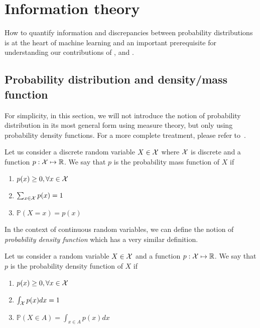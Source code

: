 \section{Information theory}
\label{sec:infoth}
How to quantify information and discrepancies between probability distributions is at the heart of machine learning and an important prerequisite for understanding our contributions of ,  and .

\subsection{Probability distribution and density/mass function}
For simplicity, in this section, we will not introduce the notion of probability distribution in its most general form using measure theory, but only using probability density functions. For a more complete treatment, please refer to~\citet{kolmogorov2018foundations, billingsley2008probability}.

\begin{definition}
Let us consider a discrete random variable $X \in {\mathcal{X}}$ where ${\mathcal{X}}$ is discrete and a function $p: {\mathcal{X}} \mapsto \mathbb{R}$. We say that $p$ is the probability mass function of $X$ if
\begin{enumerate}
    \item $p(x) \ge 0, \forall x \in {\mathcal{X}}$
    \item $\sum_{x \in {\mathcal{X}}} p(x) = 1$
    \item $\mathbb{P}(X = x) = p(x)$
\end{enumerate}
\end{definition}

In the context of continuous random variables, we can define the notion of \emph{probability density function} which has a very similar definition.
\begin{definition}
Let us consider a random variable $X \in {\mathcal{X}}$ and a function $p: {\mathcal{X}} \mapsto \mathbb{R}$. We say that $p$ is the probability density function of $X$ if
\begin{enumerate}
    \item $p(x) \ge 0, \forall x \in {\mathcal{X}}$
    \item $\int_{\mathcal{X}} p(x) dx = 1$
    \item $\mathbb{P}(X \in A) = \int_{x\in A} p(x) dx$
\end{enumerate}
\end{definition}

